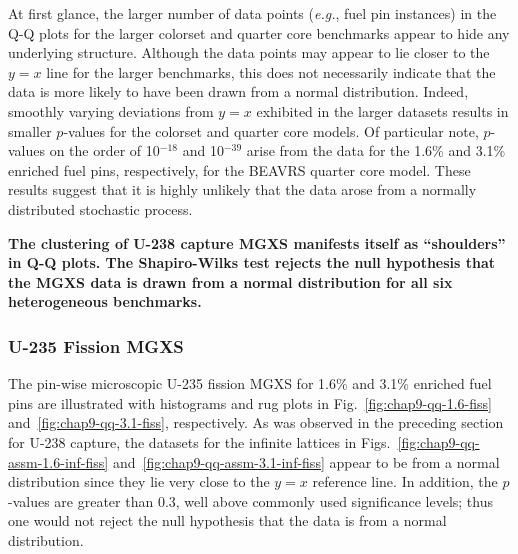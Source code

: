 At first glance, the larger number of data points (\textit{e.g.}, fuel pin instances) in the \ac{Q-Q} plots for the larger colorset and quarter core benchmarks appear to hide any underlying structure. Although the data points may appear to lie closer to the $y = x$ line for the larger benchmarks, this does not necessarily indicate that the data is more likely to have been drawn from a normal distribution. Indeed, smoothly varying deviations from $y = x$ exhibited in the larger datasets results in smaller $p$-values for the colorset and quarter core models. Of particular note, $p$-values on the order of 10$^{-18}$ and 10$^{-39}$ arise from the data for the 1.6\% and 3.1\% enriched fuel pins, respectively, for the \ac{BEAVRS} quarter core model. These results suggest that it is highly unlikely that the data arose from a normally distributed stochastic process.


\begin{emphbox}
\textbf{The clustering of U-238 capture \ac{MGXS} manifests itself as ``shoulders'' in \ac{Q-Q} plots. The Shapiro-Wilks test rejects the null hypothesis that the \ac{MGXS} data is drawn from a normal distribution for all six heterogeneous benchmarks.}
\end{emphbox}

\subsubsection{U-235 Fission MGXS}
\label{subsubsec:chap9-qq-plots-fiss}

The pin-wise microscopic U-235 fission \ac{MGXS} for 1.6\% and 3.1\% enriched fuel pins are illustrated with histograms and rug plots in Fig.~\ref{fig:chap9-qq-1.6-fiss} and~\ref{fig:chap9-qq-3.1-fiss}, respectively. As was observed in the preceding section for U-238 capture, the datasets for the infinite lattices in Figs.~\ref{fig:chap9-qq-assm-1.6-inf-fiss} and~\ref{fig:chap9-qq-assm-3.1-inf-fiss} appear to be from a normal distribution since they lie very close to the $y = x$ reference line. In addition, the $p$-values are greater than 0.3, well above commonly used significance levels; thus one would not reject the null hypothesis that the data is from a normal distribution.

